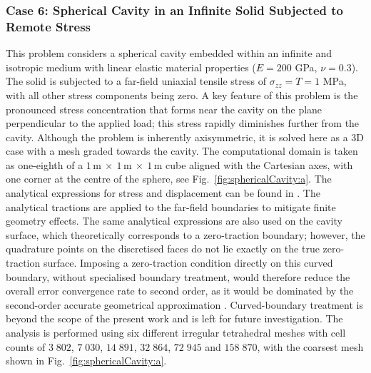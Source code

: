\documentclass[review,3p]{elsarticle}
\begin{document}
\subsubsection{Case 6: Spherical Cavity in an Infinite Solid Subjected to Remote Stress}
\label{case:sphericalCavity}
%
This problem considers a spherical cavity embedded within an infinite and isotropic medium with linear elastic material properties ($E = 200$ GPa, $\nu = 0.3$).
The solid is subjected to a far-field uniaxial tensile stress of $\sigma_{zz} = T = 1$ MPa, with all other stress components being zero.
A key feature of this problem is the pronounced stress concentration that forms near the cavity on the plane perpendicular to the applied load; 
this stress rapidly diminishes further from the cavity. 
Although the problem is inherently axisymmetric, it is solved here as a 3D case with a mesh graded towards the cavity.
The computational domain is taken as one-eighth of a $1\,\text{m}~\times~1\,\text{m}~\times~1\,\text{m}$ cube aligned with the Cartesian axes, with one corner at the centre of the sphere, see Fig.~\ref{fig:sphericalCavity:a}.
The analytical expressions for stress \cite{Southwell1926} and displacement \cite{Goodier1933} can be found in \cite{Cardiff2025}.
The analytical tractions are applied to the far-field boundaries to mitigate finite geometry effects. 
The same analytical expressions are also used on the cavity surface, which theoretically corresponds to a zero-traction boundary; however, the quadrature points on the discretised faces do not lie exactly on the true zero-traction surface. Imposing a zero-traction condition directly on this curved boundary, without specialised boundary treatment, would therefore reduce the overall error convergence rate to second order, as it would be dominated by the second-order accurate geometrical approximation \cite{costa2021, Gooch2002}.  
Curved-boundary treatment is beyond the scope of the present work and is left for future investigation.
The analysis is performed using six different irregular tetrahedral meshes with cell counts of $3\;802$, $7\;030$, $14\;891$, $32\;864$, $72\;945$ and $158\;870$, with the coarsest mesh shown in Fig.~\ref{fig:sphericalCavity:a}.
\end{document}
